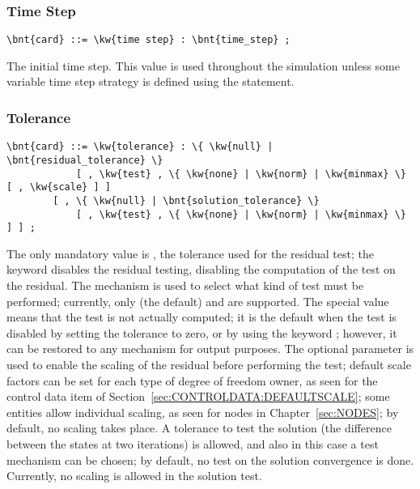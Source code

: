 \subsubsection{Time Step}
\begin{Verbatim}[commandchars=\\\{\}]
    \bnt{card} ::= \kw{time step} : \bnt{time_step} ;
\end{Verbatim}
The initial time step.
This value is used throughout the simulation unless some variable time step
strategy is defined using the  statement.

\subsubsection{Tolerance}\label{sec:IVP:TOLERANCE}
\begin{Verbatim}[commandchars=\\\{\}]
    \bnt{card} ::= \kw{tolerance} : \{ \kw{null} | \bnt{residual_tolerance} \}
            [ , \kw{test} , \{ \kw{none} | \kw{norm} | \kw{minmax} \} [ , \kw{scale} ] ]
        [ , \{ \kw{null} | \bnt{solution_tolerance} \} 
            [ , \kw{test} , \{ \kw{none} | \kw{norm} | \kw{minmax} \} ] ] ;
\end{Verbatim}
The only mandatory value is , 
the tolerance used for the residual test; the keyword 
disables the residual testing, disabling the computation
of the test on the residual.
The  mechanism is used to select what kind of test must
be performed; currently, only  (the default) 
and  are supported.
The special value  means that the test is not actually 
computed; it is the default when the test is disabled by setting
the tolerance to zero, or by using the keyword ;
however, it can be restored to any mechanism for output purposes.
The optional parameter  is used to enable the scaling
of the residual before performing the test; default scale factors 
can be set for each type of degree of freedom owner, as seen for the control data item of Section~\ref{sec:CONTROLDATA:DEFAULTSCALE}; some
entities allow individual scaling, as seen for nodes in Chapter~\ref{sec:NODES}; by default, no scaling takes place.
A tolerance  to test the solution 
(the difference between the states at two iterations) is allowed, 
and also in this case a test mechanism can be chosen;
by default, no test on the solution convergence is done.
Currently, no scaling is allowed in the solution test.

